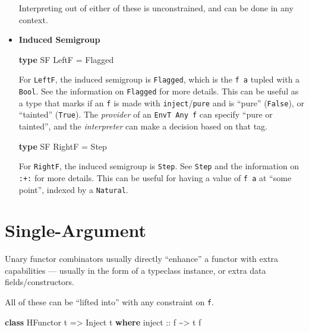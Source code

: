 \documentclass[]{article}
\newenvironment{Shaded}{}{}
\newcommand{\DataTypeTok}[1]{\textcolor[rgb]{0.56,0.13,0.00}{#1}}
\newcommand{\KeywordTok}[1]{\textcolor[rgb]{0.00,0.44,0.13}{\textbf{#1}}}
\newcommand{\NormalTok}[1]{#1}
\newcommand{\OperatorTok}[1]{\textcolor[rgb]{0.40,0.40,0.40}{#1}}
\newcommand{\OtherTok}[1]{\textcolor[rgb]{0.00,0.44,0.13}{#1}}
\begin{document}
\begin{itemize}
  Interpreting out of either of these is unconstrained, and can be done in any
  context.
\item
  \textbf{Induced Semigroup}

\begin{Shaded}
\begin{Highlighting}[]
\KeywordTok{type} \DataTypeTok{SF} \DataTypeTok{LeftF} \OtherTok{=} \DataTypeTok{Flagged}
\end{Highlighting}
\end{Shaded}

  For \texttt{LeftF}, the induced semigroup is \texttt{Flagged}, which is the
  \texttt{f\ a} tupled with a \texttt{Bool}. See the information on
  \texttt{Flagged} for more details. This can be useful as a type that marks if
  an \texttt{f} is made with \texttt{inject}/\texttt{pure} and is ``pure''
  (\texttt{False}), or ``tainted'' (\texttt{True}). The \emph{provider} of an
  \texttt{EnvT\ Any\ f} can specify ``pure or tainted'', and the
  \emph{interpreter} can make a decision based on that tag.

\begin{Shaded}
\begin{Highlighting}[]
\KeywordTok{type} \DataTypeTok{SF} \DataTypeTok{RightF} \OtherTok{=} \DataTypeTok{Step}
\end{Highlighting}
\end{Shaded}

  For \texttt{RightF}, the induced semigroup is \texttt{Step}. See \texttt{Step}
  and the information on \texttt{:+:} for more details. This can be useful for
  having a value of \texttt{f\ a} at ``some point'', indexed by a
  \texttt{Natural}.
\end{itemize}

\hypertarget{single-argument}{%
\section{Single-Argument}\label{single-argument}}

Unary functor combinators usually directly ``enhance'' a functor with extra
capabilities --- usually in the form of a typeclass instance, or extra data
fields/constructors.

All of these can be ``lifted into'' with any constraint on \texttt{f}.

\begin{Shaded}
\begin{Highlighting}[]
\KeywordTok{class} \DataTypeTok{HFunctor}\NormalTok{ t }\OtherTok{=>} \DataTypeTok{Inject}\NormalTok{ t }\KeywordTok{where}
\OtherTok{    inject ::}\NormalTok{ f }\OperatorTok{\textasciitilde{}>}\NormalTok{ t f}
\end{Highlighting}
\end{Shaded}
\end{document}
